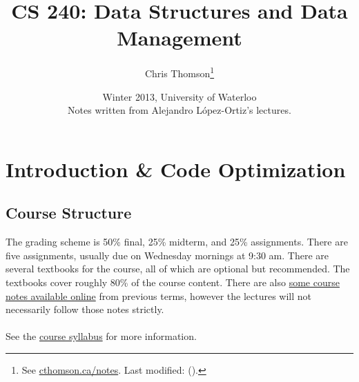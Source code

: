 \documentclass[]{article}
\theoremstyle{definition}
\newcommand{\lecture}[1]{\marginpar{{\footnotesize $\leftarrow$ \underline{#1}}}}
\begin{document}
	\let\ref\Cref

	\title{\bf{CS 240: Data Structures and Data Management}}
	\date{Winter 2013, University of Waterloo \\ \center Notes written from Alejandro L\'opez-Ortiz's lectures.}
	\author{Chris Thomson\thanks{See \href{http://cthomson.ca/notes}{cthomson.ca/notes}.
	\ifdefined\sha %
		Last modified: \commitDateTime{} ({\href{https://github.com/christhomson/lecture-notes/commit/\sha}{\sha}}).
	\fi}}
	\maketitle
	\newpage
	\tableofcontents
	\newpage

	\section{Introduction \& Code Optimization} \lecture{January 8, 2013}
		\subsection{Course Structure}
			The grading scheme is 50\% final, 25\% midterm, and 25\% assignments. There are five assignments, usually due on Wednesday mornings at 9:30 am. There are several textbooks for the course, all of which are optional but recommended. The textbooks cover roughly 80\% of the course content. There are also \href{https://www.student.cs.uwaterloo.ca/~cs240/w13/lectures.phtml}{some course notes available online} from previous terms, however the lectures will not necessarily follow those notes strictly.
			\\ \\
			See the \href{https://www.student.cs.uwaterloo.ca/~cs240/w13/info.phtml}{course syllabus} for more information.
\end{document}
